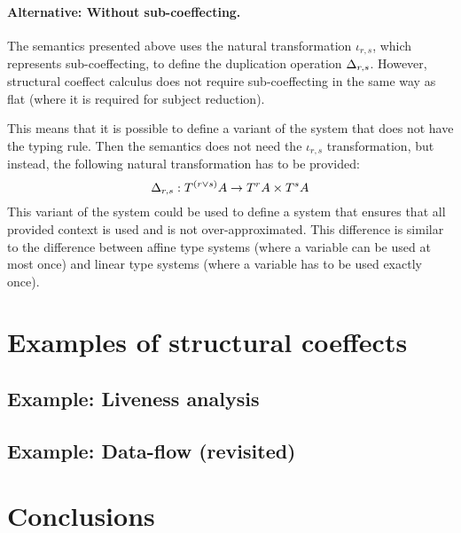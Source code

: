 \paragraph{Alternative: Without sub-coeffecting.} The semantics presented above uses the natural
transformation $\iota_{r, s}$, which represents sub-coeffecting, to define the duplication
operation $\Delta_{r, s}$. However, structural coeffect calculus \clstr does not require 
sub-coeffecting in the same way as flat \clflt (where it is required for subject reduction).

This means that it is possible to define a variant of the system that does not have the  
typing rule. Then the semantics does not need the $\iota_{r, s}$ transformation, but instead,
the following natural transformation has to be provided:
%
\begin{equation*}
\Delta_{r, s} : T^{(r \vee s)}A \rightarrow T^r A \times T^s A
\end{equation*}
%
This variant of the system could be used to define a system that ensures that all provided 
context is used and is not over-approximated. This difference is similar to the difference between
affine type systems (where a variable can be used at most once) and linear type systems 
(where a variable has to be used exactly once).


\section{Examples of structural coeffects}

\subsection{Example: Liveness analysis}
\label{sec:structural-neededness}

\subsection{Example: Data-flow (revisited) }
\label{sec:structural-tainting}

  
\section{Conclusions}

